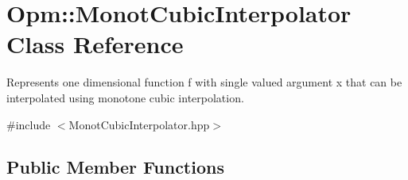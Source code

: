 \hypertarget{class_opm_1_1_monot_cubic_interpolator}{}\section{Opm\+:\+:Monot\+Cubic\+Interpolator Class Reference}
\label{class_opm_1_1_monot_cubic_interpolator}


Represents one dimensional function f with single valued argument x that can be interpolated using monotone cubic interpolation.  




{\ttfamily \#include $<$Monot\+Cubic\+Interpolator.\+hpp$>$}

\subsection*{Public Member Functions}
